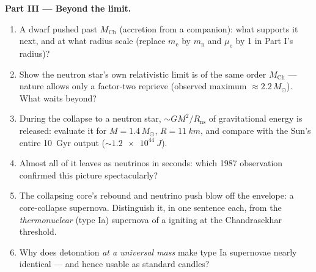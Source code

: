 \begin{problem}
\medskip\noindent\textbf{Part III --- Beyond the limit.}
\begin{enumerate}[resume]
  \item A dwarf pushed past $M_{\text{Ch}}$ (accretion from a
        companion): what supports it next, and at what radius
        scale (replace $m_{\text{e}}$ by $m_{\text{n}}$ and
        $\mu_e$ by 1 in Part I's radius)?
  \item Show the neutron star's own relativistic limit is of the
        same order $M_{\text{Ch}}$ --- nature allows only a
        factor-two reprieve (observed maximum $\approx
        2.2\,M_\odot$). What waits beyond?
  \item During the collapse to a neutron star, $\sim GM^2/R_{
        \text{ns}}$ of gravitational energy is released: evaluate
        it for $M = 1.4\,M_\odot$, $R = \qty{11}{km}$, and
        compare with the Sun's entire \qty{10}{Gyr} output
        ($\sim\qty{1.2e44}{J}$).
  \item Almost all of it leaves as neutrinos in seconds: which
        1987 observation confirmed this picture spectacularly?
  \item The collapsing core's rebound and neutrino push blow off
        the envelope: a core-collapse supernova. Distinguish it,
        in one sentence each, from the \emph{thermonuclear}
        (type Ia) supernova of a  igniting at the
        Chandrasekhar threshold.
  \item Why does detonation \emph{at a universal mass} make
        type Ia supernovae nearly identical --- and hence usable
        as standard candles?
\end{enumerate}


\end{problem}
